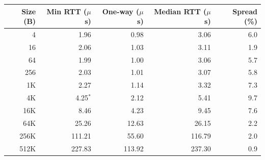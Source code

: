 \begin{tabular}{@{}rrrrr@{}}
\toprule
Size (B) & Min RTT ($\mu$s) & One-way ($\mu$s) & Median RTT ($\mu$s) & Spread (\%) \\
\midrule
4 & 1.96 & 0.98 & 3.06 & 6.0 \\
16 & 2.06 & 1.03 & 3.11 & 1.9 \\
64 & 1.99 & 1.00 & 3.06 & 5.7 \\
256 & 2.03 & 1.01 & 3.07 & 5.8 \\
1K & 2.27 & 1.14 & 3.32 & 7.3 \\
4K & 4.25$^{\ast}$ & 2.12 & 5.41 & 9.7 \\
16K & 8.46 & 4.23 & 9.45 & 7.6 \\
64K & 25.26 & 12.63 & 26.15 & 2.2 \\
256K & 111.21 & 55.60 & 116.79 & 2.0 \\
512K & 227.83 & 113.92 & 237.30 & 0.9 \\
\bottomrule
\end{tabular}
